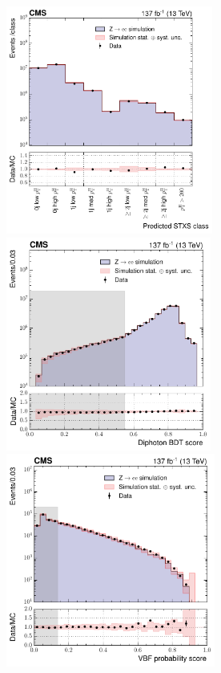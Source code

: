 \begin{figure}[htbp]
  \centering
  \hfill
  \includegraphics[height=7.5cm]{Figures/hgg_overview/DYValidation_ggH_argmax_ratioPlot_logPlot.pdf}
  \hfill
  \includegraphics[height=7cm]{Figures/hgg_overview/DYValidation_DiphoBDT_ratioPlot_dipho_mva_logPlot.pdf}
  \includegraphics[height=7cm]{Figures/hgg_overview/DYValidation_VBFBDT_ratioPlot_vbfMvaResult_prob_VBF_logPlot.pdf}

\end{figure}

